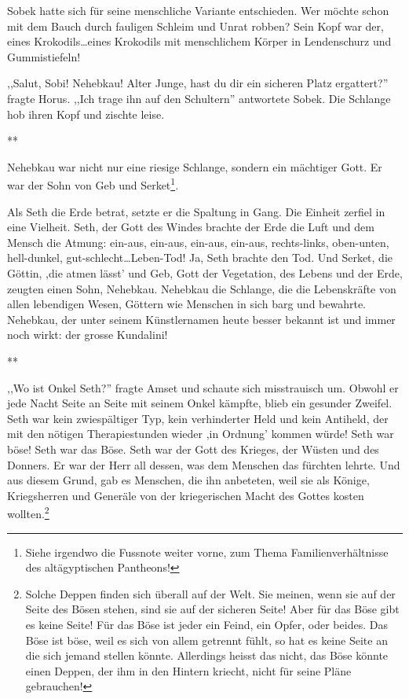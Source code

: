 \documentclass[11pt,titlepage,a5paper]{book}
\newcommand{\sterne}{\par{\centering ***\par}}
\begin{document}
Sobek hatte sich für seine menschliche Variante entschieden. Wer möchte schon mit dem Bauch durch fauligen Schleim und Unrat robben? Sein Kopf war der, eines Krokodils\dots eines Krokodils mit menschlichem Körper in Lendenschurz und Gummistiefeln!
 
,,Salut, Sobi! Nehebkau! Alter Junge, hast du dir ein sicheren Platz ergattert?'' fragte Horus. ,,Ich trage ihn auf den Schultern'' antwortete Sobek. Die Schlange hob ihren Kopf und zischte leise. 

\sterne
Nehebkau war nicht nur eine riesige Schlange, sondern ein mächtiger Gott. Er war der Sohn von Geb und Serket\footnote{Siehe irgendwo die Fussnote weiter vorne, zum Thema Familienverhältnisse des altägyptischen Pantheons!}.

Als Seth die Erde betrat, setzte er die Spaltung in Gang. Die Einheit zerfiel in eine Vielheit. Seth, der Gott des Windes brachte der Erde die Luft und dem Mensch die Atmung: ein-aus, ein-aus, ein-aus, ein-aus, rechts-links, oben-unten, hell-dunkel, gut-schlecht\dots Leben-Tod! Ja, Seth brachte den Tod. Und Serket, die Göttin, ,die atmen lässt' und Geb, Gott der Vegetation, des Lebens und der Erde, zeugten einen Sohn, Nehebkau. Nehebkau die Schlange, die die Lebenskräfte von allen lebendigen Wesen, Göttern wie Menschen in sich barg und bewahrte. Nehebkau, der unter seinem  Künstlernamen heute besser bekannt ist und immer noch wirkt: der grosse Kundalini!

\sterne
 
,,Wo ist Onkel Seth?'' fragte Amset und schaute sich misstrauisch um. Obwohl er jede Nacht Seite an Seite mit seinem Onkel kämpfte, blieb ein gesunder Zweifel. Seth war kein zwiespältiger Typ, kein verhinderter Held und kein Antiheld, der mit den nötigen Therapiestunden wieder ,in Ordnung' kommen würde! Seth war böse! Seth war das Böse. Seth war der Gott des Krieges, der Wüsten und des Donners. Er war der Herr all dessen, was dem Menschen das fürchten lehrte. Und aus diesem Grund, gab es Menschen, die ihn anbeteten, weil sie als Könige, Kriegsherren und Generäle von der kriegerischen Macht des Gottes kosten wollten.\footnote{Solche Deppen finden sich überall auf der Welt. Sie meinen, wenn sie auf der Seite des Bösen stehen, sind sie auf der sicheren Seite! Aber für das Böse gibt es keine Seite! Für das Böse ist jeder ein Feind, ein Opfer, oder beides. Das Böse ist böse, weil es sich von allem getrennt fühlt, so  hat es keine Seite an die sich jemand stellen könnte. Allerdings heisst das nicht, das Böse könnte einen Deppen, der ihm in den Hintern kriecht, nicht für seine Pläne gebrauchen!}
\end{document}
